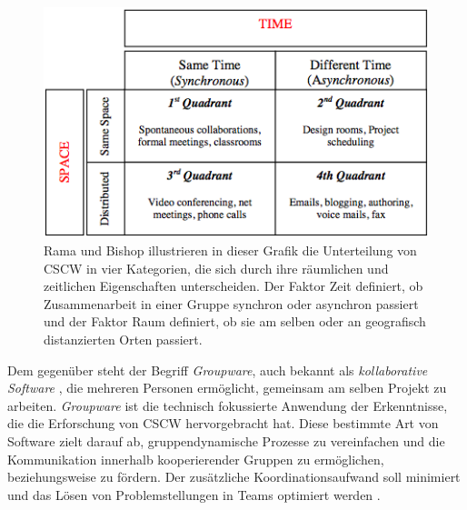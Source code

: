 \begin{figure}[bth]
	\includegraphics[width=\textwidth]{gfx/ramaCSCWQuadranten.png}
	\caption{Rama und Bishop \citep{Rama:2006p245} illustrieren in dieser Grafik die Unterteilung von CSCW in vier Kategorien, die sich durch ihre räumlichen und zeitlichen Eigenschaften unterscheiden. Der Faktor Zeit definiert, ob Zusammenarbeit in einer Gruppe synchron oder asynchron passiert und der Faktor Raum definiert, ob sie am selben oder an geografisch distanzierten Orten passiert.}
	\label{fig:ramaCSCW}
\end{figure}

Dem gegenüber steht der Begriff \emph{Groupware}, auch bekannt als \emph{kollaborative Software} \citep{Bannon:1990p244}, die mehreren Personen ermöglicht, gemeinsam am selben Projekt zu arbeiten. \emph{Groupware} ist die technisch fokussierte Anwendung der Erkenntnisse, die die Erforschung von CSCW hervorgebracht hat. Diese bestimmte Art von Software zielt darauf ab, gruppendynamische Prozesse zu vereinfachen und die Kommunikation innerhalb kooperierender Gruppen zu ermöglichen, beziehungsweise zu fördern. Der zusätzliche Koordinationsaufwand soll minimiert und das Lösen von Problemstellungen in Teams optimiert werden \citep{Rama:2006p245}.


